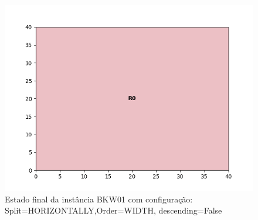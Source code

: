\begin{figure}[H]
    \centering
    \caption[]{Estado final da instância BKW01 com configuração: Split=HORIZONTALLY,Order=WIDTH, descending=False}
    \label{fig:bkw01-horizontally-width-false}
    \includegraphics[scale=0.5]{output/figures/bkw/bkw01/horizontally/width/false/00}
\end{figure}